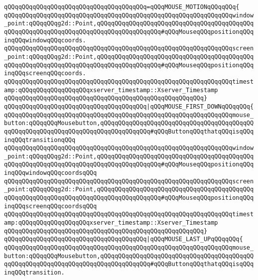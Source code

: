 \verb|qQQqqQQqqQQqqQQqqQQqqQQqqQQqqQQqqQQqqQQq=qQQqMOUSE_MOTIONqQQqqQQq{|\newline
\verb|qQQqqQQqqQQqqQQqqQQqqQQqqQQqqQQqqQQqqQQqqQQqqQQqqQQqqQQqqQQqqQQqwindow_point:qQQqqQQqg2d::Point,qQQqqQQqqQQqqQQqqQQqqQQqqQQqqQQqqQQqqQQqqQQqqQQqqQQqqQQqqQQqqQQqqQQqqQQqqQQqqQQqqQQqqQQq#qQQqMouseqQQqpositionqQQqinqQQqwindowqQQqcoords.|\newline
\verb|qQQqqQQqqQQqqQQqqQQqqQQqqQQqqQQqqQQqqQQqqQQqqQQqqQQqqQQqqQQqqQQqscreen_point:qQQqqQQqg2d::Point,qQQqqQQqqQQqqQQqqQQqqQQqqQQqqQQqqQQqqQQqqQQqqQQqqQQqqQQqqQQqqQQqqQQqqQQqqQQqqQQqqQQqqQQq#qQQqMouseqQQqpositionqQQqinqQQqscreenqQQqcoords.|\newline
\verb|qQQqqQQqqQQqqQQqqQQqqQQqqQQqqQQqqQQqqQQqqQQqqQQqqQQqqQQqqQQqqQQqtimestamp:qQQqqQQqqQQqqQQqqQQqxserver_timestamp::Xserver_Timestamp|\newline
\verb|qQQqqQQqqQQqqQQqqQQqqQQqqQQqqQQqqQQqqQQqqQQqqQQqqQQqqQQq}|\newline
\newline
\verb|qQQqqQQqqQQqqQQqqQQqqQQqqQQqqQQqqQQqqQQq|\verb#|qQQqMOUSE_FIRST_DOWNqQQqqQQq{#\newline
\verb|qQQqqQQqqQQqqQQqqQQqqQQqqQQqqQQqqQQqqQQqqQQqqQQqqQQqqQQqqQQqqQQqmouse_button:qQQqqQQqMousebutton,qQQqqQQqqQQqqQQqqQQqqQQqqQQqqQQqqQQqqQQqqQQqqQQqqQQqqQQqqQQqqQQqqQQqqQQqqQQqqQQqqQQq#qQQqButtonqQQqthatqQQqisqQQqinqQQqtransitionqQQq|\newline
\verb|qQQqqQQqqQQqqQQqqQQqqQQqqQQqqQQqqQQqqQQqqQQqqQQqqQQqqQQqqQQqqQQqwindow_point:qQQqqQQqg2d::Point,qQQqqQQqqQQqqQQqqQQqqQQqqQQqqQQqqQQqqQQqqQQqqQQqqQQqqQQqqQQqqQQqqQQqqQQqqQQqqQQqqQQqqQQq#qQQqMouseqQQqpositionqQQqinqQQqwindowqQQqcoordsqQQq|\newline
\verb|qQQqqQQqqQQqqQQqqQQqqQQqqQQqqQQqqQQqqQQqqQQqqQQqqQQqqQQqqQQqqQQqscreen_point:qQQqqQQqg2d::Point,qQQqqQQqqQQqqQQqqQQqqQQqqQQqqQQqqQQqqQQqqQQqqQQqqQQqqQQqqQQqqQQqqQQqqQQqqQQqqQQqqQQqqQQq#qQQqMouseqQQqpositionqQQqinqQQqscreenqQQqcoordsqQQq|\newline
\verb|qQQqqQQqqQQqqQQqqQQqqQQqqQQqqQQqqQQqqQQqqQQqqQQqqQQqqQQqqQQqqQQqtimestamp:qQQqqQQqqQQqqQQqqQQqxserver_timestamp::Xserver_Timestamp|\newline
\verb|qQQqqQQqqQQqqQQqqQQqqQQqqQQqqQQqqQQqqQQqqQQqqQQqqQQqqQQq}|\newline
\newline
\verb|qQQqqQQqqQQqqQQqqQQqqQQqqQQqqQQqqQQqqQQq|\verb#|qQQqMOUSE_LAST_UPqQQqqQQq{#\newline
\verb|qQQqqQQqqQQqqQQqqQQqqQQqqQQqqQQqqQQqqQQqqQQqqQQqqQQqqQQqqQQqqQQqmouse_button:qQQqqQQqMousebutton,qQQqqQQqqQQqqQQqqQQqqQQqqQQqqQQqqQQqqQQqqQQqqQQqqQQqqQQqqQQqqQQqqQQqqQQqqQQqqQQqqQQq#qQQqButtonqQQqthatqQQqisqQQqinqQQqtransition.|\newline
